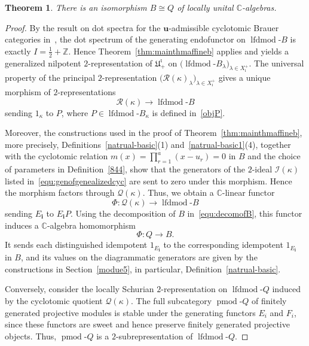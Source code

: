 \documentclass[a4,10pt]{amsart}
\numberwithin{equation}{section}
\newtheorem{Theorem}{Theorem}[section] %
\theoremstyle{definition}
\begin{document}
\begin{Theorem}\label{cyc-iso}
There is an isomorphism
\(
B\cong Q
\)
of locally unital $\mathbb C$-algebras.
\end{Theorem}
\begin{proof}
By the result on dot spectra for the $\mathbf u$-admissible
cyclotomic Brauer categories in~\cite[Theorem~6.5]{GRS-tri},
the dot spectrum of the generating endofunctor on
$\operatorname{lfdmod}\text{-}B$ is exactly
$
I=\frac12+\mathbb Z$. Hence Theorem~\ref{thm:mainthmaffineb} applies and yields a
generalized nilpotent $2$-representation of
$\mathfrak U^\imath_+$ on
$
\bigl(
\operatorname{lfdmod}\text{-}B_\lambda
\bigr)_{\lambda\in X_\imath^+}
$. The universal property of the principal $2$-representation
\(\bigl(
\mathcal R(\kappa)_\lambda
\bigr)_{\lambda\in X_\imath^+}
\)
gives a unique morphism of $2$-representations
\[
\mathcal R(\kappa)
\longrightarrow
\operatorname{lfdmod}\text{-}B
\]
sending $1_\kappa$ to $P$, where
$P\in\operatorname{lfdmod}\text{-}B_\kappa$ is defined
in~\eqref{objP}.

Moreover, the constructions used in the proof of
Theorem~\ref{thm:mainthmaffineb}, more precisely,
Definitions~\ref{natrual-basic}(1)
and~\ref{natrual-basic1}(4), together with the cyclotomic
relation
$
m(x)=\prod_{r=1}^{a}(x-u_r)=0
$
in $B$ and the choice of parameters in
Definition~\ref{844}, show that the generators of the
$2$-ideal $\mathcal I(\kappa)$ listed
in~\eqref{equ:genofgenealizedcyc} are sent to zero under this
morphism. Hence the morphism factors through
$\mathcal Q(\kappa)$.
Thus, we obtain a $\mathbb C$-linear functor
\[
\Phi:
\mathcal Q(\kappa)
\longrightarrow
\operatorname{lfdmod}\text{-}B
\]
sending $E_{\mathbf i}$ to $E_{\mathbf i}P$.
Using the decomposition of $B$ in~\eqref{equ:decomofB},
this functor induces a $\mathbb C$-algebra homomorphism
\[
\Phi:Q\longrightarrow B.
\]
It sends each distinguished idempotent
$1_{E_{\mathbf i}}$ to the corresponding idempotent
$1_{E_{\mathbf i}}$ in $B$, and its values on the
diagrammatic generators are given by the constructions in
Section~\ref{modue5}, in particular, Definition~\ref{natrual-basic}.

Conversely, consider the locally Schurian $2$-representation on
$\operatorname{lfdmod}\text{-}Q$ induced by the cyclotomic
quotient $\mathcal Q(\kappa)$. The full subcategory
$\operatorname{pmod}\text{-}Q$ of finitely generated projective
modules is stable under the generating functors $E_i$ and $F_i$,
since these functors are sweet and hence preserve finitely
generated projective objects. Thus,
$\operatorname{pmod}\text{-}Q$ is a $2$-subrepresentation of
$\operatorname{lfdmod}\text{-}Q$.


\end{proof}
\end{document}
